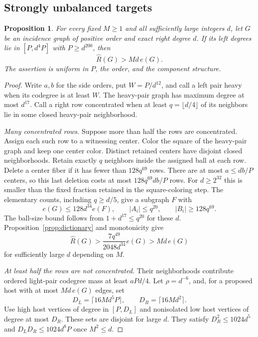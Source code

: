 \documentclass[11pt]{amsart}
\newtheorem{proposition}[theorem]{Proposition}
\theoremstyle{definition}
\theoremstyle{remark}
\numberwithin{equation}{section}
\begin{document}
\subsection{Strongly unbalanced targets}

\begin{proposition}\label{prop:unbalanced}
For every fixed $M\ge1$ and all sufficiently large integers $ d $, let $ G$
be an incidence graph of positive order and exact right degree $d$.
If its left degrees lie in $[P,d^4P]$ with $ P\ge d^{200}$, then
\[
 \widehat R(G)>Md\,e(G).
\]
The assertion is uniform in $P$, the order, and the component structure.
\end{proposition}
\begin{proof}
Write $a,b $ for the side orders, put $ W=P/d^{12}$, and call a left
pair heavy when its codegree is at least $W$. The heavy-pair graph has
maximum degree at most $d^{17}$. Call a right row concentrated when
at least $q=\lfloor d/4\rfloor$ of its neighbors lie in some closed
heavy-pair neighborhood.

\medskip\noindent\emph{Many concentrated rows.}
Suppose more than half the rows are concentrated. Assign each such row
to a witnessing center. Color the square of the heavy-pair graph and
keep one center color. Distinct retained centers have disjoint closed
neighborhoods. Retain exactly $q$ neighbors inside the assigned ball
at each row. Delete a center fiber if it has fewer than $128q^{69}$
rows. There are at most $a\le db/P$ centers, so this last deletion costs
at most $128q^{69}db/P $ rows. For $ d\ge2^{32}$ this is smaller than the
fixed fraction retained in the square-coloring step. The elementary
counts, including $q\ge d/5$, give a subgraph $ F$ with
\[
 e(G)\le128d^{34}e(F),\qquad |A_i|\le q^{20},\qquad
 |B_i|\ge128q^{69}.
\]
The ball-size bound follows from $1+d^{17}\le q^{20}$ for these $ d$.
Proposition~\ref{prop:dictionary} and monotonicity give
\[
 \widehat R(G)>\frac{7q^{49}}{2048d^{34}}e(G)>Md\,e(G)
\]
for sufficiently large $d $ depending on $ M$.

\medskip\noindent\emph{At least half the rows are not concentrated.}
Their neighborhoods contribute ordered light-pair codegree mass at least
$aPd/4$. Let $\rho=d^{-6}$, and, for a proposed host with at most
$Md\,e(G)$ edges, set
\[
 D_L=\lceil16Md^5P\rceil,\qquad D_R=\lceil16Md^2\rceil.
\]
Use high host vertices of degree in $[P,D_L]$ and nonisolated low host
vertices of degree at most $D_R $. These sets are disjoint for large $ d$.
They satisfy $D_R^2\le1024d^5$ and $ D_LD_R\le1024d^8P $ once $ M^2\le d$.


\end{proof}
\end{document}
